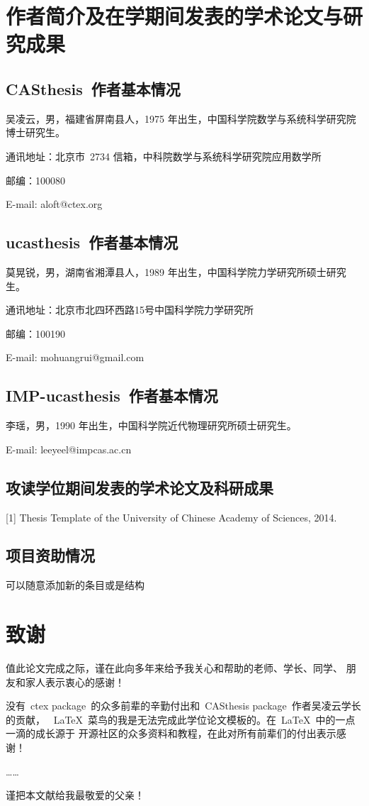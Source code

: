 \chapter{作者简介及在学期间发表的学术论文与研究成果}

\section*{CASthesis~作者基本情况}

吴凌云，男，福建省屏南县人，1975 年出生，中国科学院数学与系统科学研究院博士研究生。

通讯地址：北京市~2734 信箱，中科院数学与系统科学研究院应用数学所

邮编：100080

E-mail: aloft@ctex.org

\section*{ucasthesis~作者基本情况}

莫晃锐，男，湖南省湘潭县人，1989 年出生，中国科学院力学研究所硕士研究生。

通讯地址：北京市北四环西路15号中国科学院力学研究所

邮编：100190

E-mail: mohuangrui@gmail.com

\section*{IMP-ucasthesis~作者基本情况}

李瑶，男，1990 年出生，中国科学院近代物理研究所硕士研究生。

E-mail: leeyeel@impcas.ac.cn

\section*{攻读学位期间发表的学术论文及科研成果}

[1] Thesis Template of the University of Chinese Academy of Sciences, 2014.

\section*{项目资助情况}

可以随意添加新的条目或是结构


\chapter{致\quad 谢} 

\quad \quad 值此论文完成之际，谨在此向多年来给予我关心和帮助的老师、学长、同学、
朋友和家人表示衷心的感谢！

没有~ctex package~的众多前辈的辛勤付出和~CASthesis package~作者吴凌云学长的贡献，
~\LaTeX{}~菜鸟的我是无法完成此学位论文模板的。在~\LaTeX{}~中的一点一滴的成长源于
开源社区的众多资料和教程，在此对所有前辈们的付出表示感谢！

\ldots\ldots

谨把本文献给我最敬爱的父亲！

